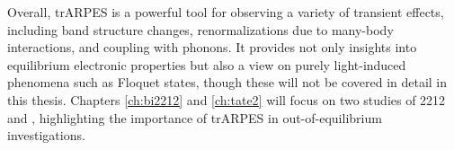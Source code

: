 Overall, trARPES is a powerful tool for observing a variety of transient effects, including band structure changes, renormalizations due to many-body interactions, and coupling with phonons.
It provides not only insights into equilibrium electronic properties but also a view on purely light-induced phenomena such as Floquet states, though these will not be covered in detail in this thesis.
Chapters \ref{ch:bi2212} and \ref{ch:tate2} will focus on two studies of 2212 and , highlighting the importance of trARPES in out-of-equilibrium investigations.